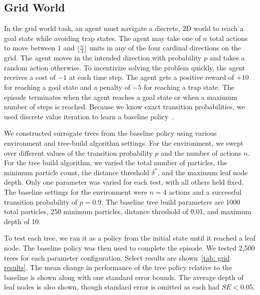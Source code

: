 \documentclass[letterpaper]{article} %
\begin{document}
\subsection{Grid World}
In the grid world task, an agent must navigate a discrete, 2D world to reach a goal state while avoiding trap states.
The agent may take one of $n$ total actions to move between $1$ and $\lfloor \frac{n}{4}\rfloor$ units in any of the four cardinal directions on the grid.
The agent moves in the intended direction with probability $p$ and takes a random action otherwise.
To incentivize solving the problem quickly, the agent receives a cost of $-1$ at each time step.
The agent gets a positive reward of $+10$ for reaching a goal state and a penalty of $-5$ for reaching a trap state.
The episode terminates when the agent reaches a goal state or when a maximum number of steps is reached.
Because we know exact transition probabilities, we used discrete value iteration to learn a baseline policy~\cite{sutton1998}.

We constructed surrogate trees from the baseline policy using various environment and tree-build algorithm settings.
For the environment, we swept over different values of the transition probability $p$ and the number of actions $n$.
For the tree build algorithm, we varied the total number of particles, the minimum particle count, the distance threshold $\delta^*$, and the maximum leaf node depth.
Only one parameter was varied for each test, with all others held fixed.
The baseline settings for the environment were $n=4$ actions and a successful transition probability of $p=0.9$.
The baseline tree build parameters are 1000 total particles, 250 minimum particles, distance threshold of 0.01, and maximum depth of 10.

To test each tree, we ran it as a policy from the initial state until it reached a leaf node.
The baseline policy was then used to complete the episode.
We tested 2,500 trees for each parameter configuration.
Select results are shown~\cref{tab: grid results}.
The mean change in performance of the tree policy relative to the baseline is shown along with one standard error bounds.
The average depth of leaf nodes is also shown, though standard error is omitted as each had $SE < 0.05$.
\end{document}
